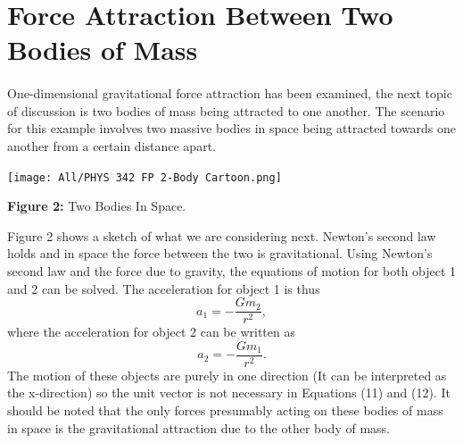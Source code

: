 \documentclass[]{article}
\begin{document}
\section{Force Attraction Between Two Bodies of Mass}
\begin{multicols}{2}
\paragraph{}
\setlength{\parskip}{1em}
One-dimensional gravitational force attraction has been examined, the next topic of discussion is two bodies of mass being attracted to one another. The scenario for this example involves two massive bodies in space being attracted towards one another from a certain distance apart. 
\begin{center}
\texttt{[image: All/PHYS 342 FP 2-Body Cartoon.png]}
\caption{\small{\textbf{Figure 2:}} \tiny{Two Bodies In Space.}}
\end{center}
Figure 2 shows a sketch of what we are considering next. Newton's second law holds and in space the force between the two is gravitational. Using Newton's second law and the force due to gravity, the equations of motion for both object 1 and 2 can be solved. The acceleration for object 1 is thus
\begin{equation}\label{11}
a_{1}=-\frac{Gm_{2}}{r^2},
\end{equation}
where the acceleration for object 2 can be written as
\begin{equation}\label{12}
a_{2}=-\frac{Gm_{1}}{r^2}.
\end{equation}
The motion of these objects are purely in one direction (It can be interpreted as the x-direction) so the unit vector is not necessary in Equations (11) and (12). It should be noted that the only forces presumably acting on these bodies of mass in space is the gravitational attraction due to the other body of mass. 
\par

\end{multicols}
\end{document}
